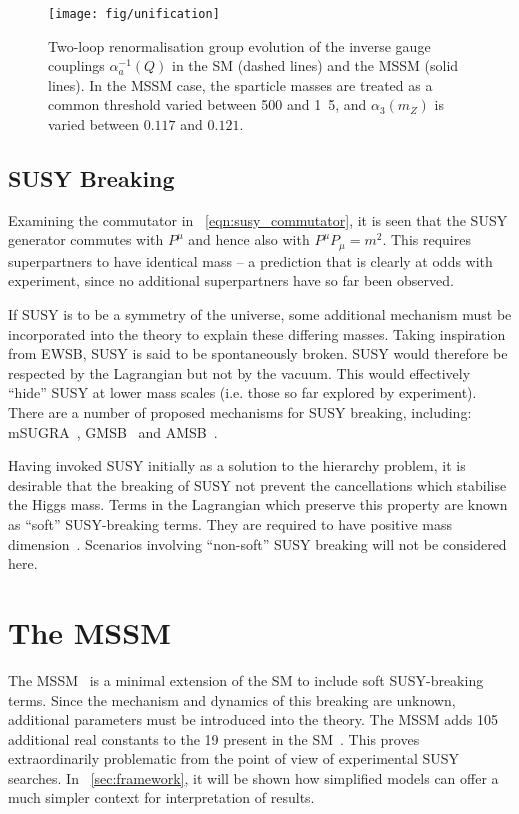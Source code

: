 \begin{figure}[h]
\centering
\texttt{[image: fig/unification]}
\caption[Two-loop renormalisation group evolution of the inverse gauge
couplings]{Two-loop renormalisation group evolution of the inverse gauge
  couplings $\alpha_a^{−1}(Q)$ in the \ac{SM} (dashed lines) and the \ac{MSSM}
  (solid lines). In the MSSM case, the sparticle masses are treated as a common
  threshold varied between \unit{500}{\GeV} and \unit{1.5}{\TeV}, and
  $\alpha_3(m_Z)$ is varied between $0.117$ and $0.121$.~\cite{susy_primer}}
\label{fig:susy_gauge_unification}
\end{figure}

\subsection{\acl{SUSY} Breaking}
Examining the commutator in \eqn~\ref{eqn:susy_commutator}, it is seen that the
\ac{SUSY} generator \Qa commutes with $P^{\mu}$ and hence also with
$P^{\mu}P_{\mu} = m^2$. This requires superpartners to have identical mass -- a
prediction that is clearly at odds with experiment, since no additional
superpartners have so far been observed.

If \ac{SUSY} is to be a symmetry of the universe, some additional mechanism
must be incorporated into the theory to explain these differing masses. Taking
inspiration from \ac{EWSB}, \ac{SUSY} is said to be spontaneously
broken. \ac{SUSY} would therefore be respected by the Lagrangian but not by
the vacuum. This would effectively ``hide'' \ac{SUSY} at lower mass scales
(i.e. those so far explored by experiment). There are a number of proposed
mechanisms for \ac{SUSY} breaking, including: \ac{mSUGRA}~\cite{msugra},
\ac{GMSB}~\cite{gmsb} and \ac{AMSB}~\cite{amsb}.

Having invoked \ac{SUSY} initially as a solution to the hierarchy problem,
it is desirable that the breaking of \ac{SUSY} not prevent the cancellations
which stabilise the Higgs mass. Terms in the Lagrangian which preserve this
property are known as ``soft'' \ac{SUSY}-breaking terms. They are required to
have positive mass dimension~\cite{susy_primer}. Scenarios involving
``non-soft'' \ac{SUSY} breaking will not be considered here.

\section{The \acl{MSSM}}
\label{sec:susy_mssm}
The \acf{MSSM}~\cite{mssm} is a minimal extension of the \ac{SM} to include soft
\ac{SUSY}-breaking terms. Since the mechanism and dynamics of this breaking are
unknown, additional parameters must be introduced into the theory. The \ac{MSSM}
adds 105 additional real constants to the 19 present in the
\ac{SM}~\cite[p.~186]{sparticles}. This proves extraordinarily problematic from
the point of view of experimental \ac{SUSY} searches. In
\chap~\ref{sec:framework}, it will be shown how simplified models can offer a
much simpler context for interpretation of results.


